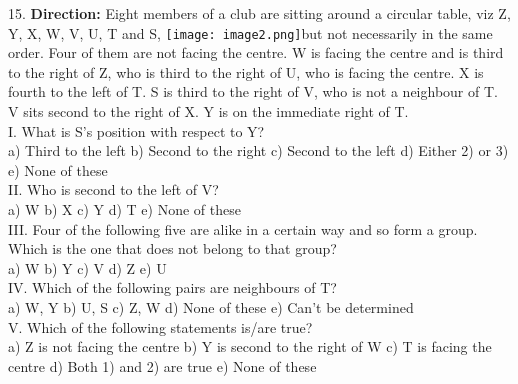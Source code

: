 \documentclass[
]{article}
\begin{document}
15. \textbf{Direction:} Eight members of a club are sitting around a circular table, viz Z, Y, X, W, V, U, T
and S, \texttt{[image: image2.png]}but not necessarily in the same order. Four of them are not facing the centre. W is
facing the centre and is third to the right of Z, who is third to the right of U, who is facing
the centre. X is fourth to the left of T. S is third to the right of V, who is not a neighbour of T.
V sits second to the right of X. Y is on the immediate right of T.\\

I. What is S’s position with respect to Y?\\
a) Third to the left \hspace{2mm}b) Second to the right \hspace{2mm}c) Second to the left \hspace{2mm}d) Either 2) or 3) \hspace{2mm}e) None of these\\

II. Who is second to the left of V?\\
a) W \hspace{2mm}b) X \hspace{2mm}c) Y \hspace{2mm}d) T \hspace{2mm}e) None of these\\

III. Four of the following five are alike in a certain way and so form a group. Which is the
one that does not belong to that group?\\
a) W \hspace{2mm}b) Y \hspace{2mm}c) V \hspace{2mm}d) Z \hspace{2mm}e) U\\

IV. Which of the following pairs are neighbours of T?\\
a) W, Y \hspace{2mm}b) U, S \hspace{2mm}c) Z, W \hspace{2mm}d) None of these \hspace{2mm}e) Can’t be determined\\

V. Which of the following statements is/are true?\\
a) Z is not facing the centre \hspace{2mm}b) Y is second to the right of W \hspace{2mm}c) T is facing the centre
\hspace{2mm}d) Both 1) and 2) are true \hspace{2mm}e) None of these\\
\end{document}
